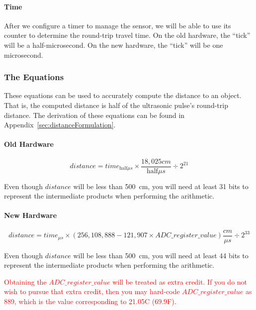 \paragraph{Time}

After we configure a timer to manage the sensor, we will be able to use its counter to determine the round-trip travel time.
On the old hardware, the ``tick'' will be a half-microsecond.
On the new hardware, the ``tick'' will be one microsecond.

\subsubsection{The Equations}\label{subsubsec:equations}

These equations can be used to accurately compute the distance to an object.
That is, the computed distance is half of the ultrasonic pulse's round-trip distance.
The derivation of these equations can be found in Appendix~\ref{sec:distanceFormulation}.

\paragraph{Old Hardware}

\[
    distance = time_{\mathrm{half}\mu s} \times \frac{18,025 cm}{\mathrm{half}\mu s} \div 2^{21}
\]

Even though $distance$ will be less than 500~cm, you will need at least 31 bits to represent the intermediate products when performing the arithmetic.

\paragraph{New Hardware}

\[
    distance = time_{\mu s} \times \left( 256,108,888 - 121,907 \times ADC\_register\_value \right) \frac{cm}{\mu s} \div 2^{33}
\]

Even though $distance$ will be less than 500~cm, you will need at least 44 bits to represent the intermediate products when performing the arithmetic.

\textcolor{red}{Obtaining the $ADC\_register\_value$ will be treated as extra credit.
If you do not wish to pursue that extra credit, then you may hard-code $ADC\_register\_value$ as 889, which is the value corresponding to 21.05\degree C (69.9\degree F).}

